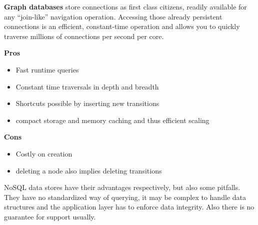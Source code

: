 \textbf{Graph databases} store connections as first class citizens, readily available for any “join-like” navigation operation. Accessing those already persistent connections is an efficient, constant-time operation and allows you to quickly traverse millions of connections per second per core.\\
\begin{minipage}[t]{0.49\textwidth}
  \textbf{Pros}
  \begin{itemize}[topsep=0pt,noitemsep]
    \item Fast runtime queries
    \item Constant time traversals in depth and breadth
    \item Shortcuts possible by inserting new transitions
    \item compact storage and memory caching and thus efficient scaling
  \end{itemize}
\end{minipage}
\begin{minipage}[t]{0.49\textwidth}
  \textbf{Cons}
  \begin{itemize}[topsep=0pt, noitemsep]
    \item Costly on creation
    \item deleting a node also implies deleting transitions
  \end{itemize}
\end{minipage}
\vspace{20pt}

NoSQL data stores have their advantages respectively, but also some pitfalls.
They have no standardized way of querying, it may be complex to handle data structures and the application layer has to enforce data integrity.
Also there is no guarantee for support usually.


